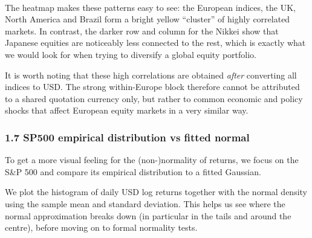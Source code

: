 \documentclass[11pt]{article}
\begin{document}
    \begin{center}
    \end{center}
    { \hspace*{\fill} \\}
    
    The heatmap makes these patterns easy to see: the European indices, the
UK, North America and Brazil form a bright yellow ``cluster'' of highly
correlated markets. In contrast, the darker row and column for the
Nikkei show that Japanese equities are noticeably less connected to the
rest, which is exactly what we would look for when trying to diversify a
global equity portfolio.

    It is worth noting that these high correlations are obtained
\emph{after} converting all indices to USD. The strong within-Europe
block therefore cannot be attributed to a shared quotation currency
only, but rather to common economic and policy shocks that affect
European equity markets in a very similar way.

    \hypertarget{sp500-empirical-distribution-vs-fitted-normal}{%
\subsubsection{1.7 SP500 empirical distribution vs fitted
normal}\label{sp500-empirical-distribution-vs-fitted-normal}}

To get a more visual feeling for the (non-)normality of returns, we
focus on the S\&P 500 and compare its empirical distribution to a fitted
Gaussian.

We plot the histogram of daily USD log returns together with the normal
density using the sample mean and standard deviation. This helps us see
where the normal approximation breaks down (in particular in the tails
and around the centre), before moving on to formal normality tests.
\end{document}
